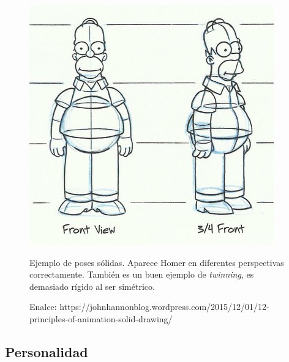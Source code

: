 \documentclass{article}
\begin{document}
\begin{figure}[H]
    \centering
    \includegraphics[width=\textwidth]{imagenes/homer-solid-drawing.jpg}
    \caption{Ejemplo de poses sólidas. Aparece Homer en diferentes perspectivas correctamente. También es un buen ejemplo de \textit{twinning}, es demasiado rígido al ser simétrico.}
    \caption{Enalce: https://johnhannonblog.wordpress.com/2015/12/01/12-principles-of-animation-solid-drawing/}
\end{figure}

\subsection{Personalidad}
\end{document}
